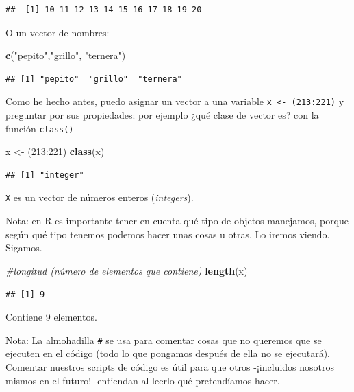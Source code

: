 \documentclass[]{book}
\newenvironment{Shaded}{\begin{snugshade}}{\end{snugshade}}
\newcommand{\KeywordTok}[1]{\textcolor[rgb]{0.13,0.29,0.53}{\textbf{{#1}}}}
\newcommand{\DecValTok}[1]{\textcolor[rgb]{0.00,0.00,0.81}{{#1}}}
\newcommand{\StringTok}[1]{\textcolor[rgb]{0.31,0.60,0.02}{{#1}}}
\newcommand{\CommentTok}[1]{\textcolor[rgb]{0.56,0.35,0.01}{\textit{{#1}}}}
\newcommand{\NormalTok}[1]{{#1}}
\theoremstyle{definition}
\theoremstyle{definition}
\theoremstyle{remark}
\begin{document}
\begin{verbatim}
##  [1] 10 11 12 13 14 15 16 17 18 19 20
\end{verbatim}

O un vector de nombres:

\begin{Shaded}
\begin{Highlighting}[]
\KeywordTok{c}\NormalTok{(}\StringTok{"pepito"}\NormalTok{,}\StringTok{"grillo"}\NormalTok{, }\StringTok{"ternera"}\NormalTok{)}
\end{Highlighting}
\end{Shaded}

\begin{verbatim}
## [1] "pepito"  "grillo"  "ternera"
\end{verbatim}

Como he hecho antes, puedo asignar un vector a una variable
\texttt{x\ \textless{}-\ (213:221)} y preguntar por sus propiedades: por
ejemplo ¿qué clase de vector es? con la función \texttt{class()}

\begin{Shaded}
\begin{Highlighting}[]
\NormalTok{x <-}\StringTok{ }\NormalTok{(}\DecValTok{213}\NormalTok{:}\DecValTok{221}\NormalTok{)}
\KeywordTok{class}\NormalTok{(x)}
\end{Highlighting}
\end{Shaded}

\begin{verbatim}
## [1] "integer"
\end{verbatim}

\texttt{X} es un vector de números enteros (\emph{integers}).

Nota: en R es importante tener en cuenta qué tipo de objetos manejamos,
porque según qué tipo tenemos podemos hacer unas cosas u otras. Lo
iremos viendo. Sigamos.

\begin{Shaded}
\begin{Highlighting}[]
\CommentTok{#longitud (número de elementos que contiene)}
\KeywordTok{length}\NormalTok{(x)}
\end{Highlighting}
\end{Shaded}

\begin{verbatim}
## [1] 9
\end{verbatim}

Contiene 9 elementos.

Nota: La almohadilla \texttt{\#} se usa para comentar cosas que no
queremos que se ejecuten en el código (todo lo que pongamos después de
ella no se ejecutará). Comentar nuestros scripts de código es útil para
que otros -¡incluidos nosotros mismos en el futuro!- entiendan al leerlo
qué pretendíamos hacer.
\end{document}
